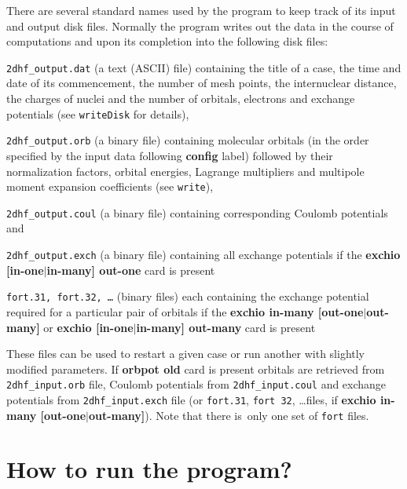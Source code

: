 \documentclass[12pt,a4paper]{article}
\begin{document}
There are several standard names used by the program to keep track of its input and output
disk files. Normally the program writes out the data in the course of computations and
upon its completion into the following disk files:
\begin{description}

\item \texttt{2dhf\_output.dat} (a text (ASCII) file) containing the title of a case, the
  time and date of its commencement, the number of mesh points, the internuclear distance,
  the charges of nuclei and the number of orbitals, electrons and exchange potentials (see
  \texttt{writeDisk} for details),

\item \texttt{2dhf\_output.orb} (a binary file) containing molecular orbitals (in the
  order specified by the input data following \textbf{config} label) followed by their
  normalization factors, orbital energies, Lagrange multipliers and multipole moment
  expansion coefficients (see \texttt{write\*}),

\item \texttt{2dhf\_output.coul} (a binary file) containing
  corresponding Coulomb potentials and

\item \texttt{2dhf\_output.exch} (a binary file) containing all exchange potentials if the
  \textbf{exchio [in-one$|$in-many] out-one} card is present

\item \texttt{fort.31, fort.32, \ldots} (binary files) each containing the exchange
  potential required for a particular pair of orbitals if the \textbf{exchio in-many
    [out-one$|$out-many]} or \textbf{exchio [in-one$|$in-many] out-many} card is present
\end{description}

These files can be used to restart a given case or run another with slightly modified
parameters. If \textbf{orbpot old} card is present orbitals are retrieved from
\texttt{2dhf\-\_in\-put\-.orb} file, Coulomb potentials from \texttt{2dhf\_input.coul} and
exchange potentials from \texttt{2dhf\_input.exch} file (or \texttt{fort.31}, \texttt{fort
  32}, \ldots files, if \textbf{exchio in-many [out-one$|$out-many]}). Note that there
is~only one set of \texttt{fort} files.

\bigskip

\section{How to run the program?}
\end{document}

